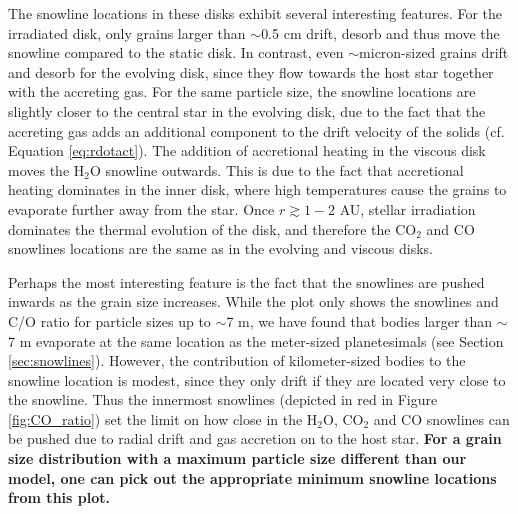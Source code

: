 \documentclass[apj]{emulateapj}
\begin{document}
The snowline locations in these disks exhibit several interesting features. For the irradiated disk, only grains larger than $\sim$0.5 cm drift, desorb and thus move the snowline compared to the static disk. In contrast, even $\sim$micron-sized grains drift and desorb for the evolving disk, since they flow towards the host star together with the accreting gas. For the same particle size, the snowline locations are slightly closer to the central star in the evolving disk, due to the fact that the accreting gas adds an additional component to the drift velocity of the solids (cf. Equation \ref{eq:rdotact}). The addition of accretional heating in the viscous disk moves the H$_2$O snowline outwards. This is due to the fact that accretional heating dominates in the inner disk, where high temperatures cause the grains to evaporate further away from the star. Once $r\gtrsim1-2$  AU, stellar irradiation dominates the thermal evolution of the disk, and therefore the CO$_2$ and CO snowlines locations are the same as in the evolving and viscous disks. 

Perhaps the most interesting feature is the fact that the snowlines are pushed inwards as the grain size increases. While the plot only shows the snowlines and C/O ratio for particle sizes up to $\sim$7 m, we have found that %
bodies larger than $\sim$7 m evaporate at the same location as the meter-sized planetesimals (see Section \ref{sec:snowlines}). However, the contribution of kilometer-sized bodies to the snowline location is modest, since they only drift if they are located very close to the snowline.
Thus the innermost snowlines (depicted in red in Figure \ref{fig:CO_ratio}) set the limit on how close in the H$_2$O, CO$_2$ and CO snowlines can be pushed due to radial drift and gas accretion on to the host star. \textbf{For a grain size distribution with a maximum particle size different than our model, one can pick out the appropriate minimum snowline locations from this plot.}%
\end{document}

